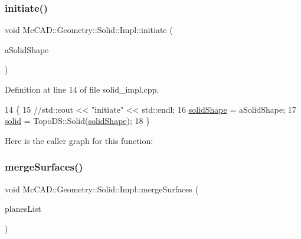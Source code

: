 \mbox{\label{classMcCAD_1_1Geometry_1_1Solid_1_1Impl_a2f57c8ff307a31cf90fa29cebf14ff3f}} 
\subsubsection{\texorpdfstring{initiate()}{initiate()}\hspace{0.1cm}{\footnotesize\ttfamily [2/2]}}
{\footnotesize\ttfamily void Mc\+C\+A\+D\+::\+Geometry\+::\+Solid\+::\+Impl\+::initiate (\begin{DoxyParamCaption}\item[{const Topo\+D\+S\+\_\+\+Shape \&}]{a\+Solid\+Shape }\end{DoxyParamCaption})}



Definition at line 14 of file solid\+\_\+impl.\+cpp.


\begin{DoxyCode}
14                                                                \{
15     \textcolor{comment}{//std::cout << "initiate" << std::endl;}
16     \hyperlink{classMcCAD_1_1Geometry_1_1Solid_1_1Impl_afcbcbf0a3fa169631d546d96e430f91f}{solidShape} = aSolidShape;
17     \hyperlink{classMcCAD_1_1Geometry_1_1Solid_1_1Impl_a279f71c11f2a7b285e3093879baf9362}{solid} = TopoDS::Solid(\hyperlink{classMcCAD_1_1Geometry_1_1Solid_1_1Impl_afcbcbf0a3fa169631d546d96e430f91f}{solidShape});
18 \}
\end{DoxyCode}
Here is the caller graph for this function\+:
\mbox{\label{classMcCAD_1_1Geometry_1_1Solid_1_1Impl_a7f434941fa38e84186ebb026342984c8}} 
\subsubsection{\texorpdfstring{merge\+Surfaces()}{mergeSurfaces()}\hspace{0.1cm}{\footnotesize\ttfamily [1/2]}}
{\footnotesize\ttfamily void Mc\+C\+A\+D\+::\+Geometry\+::\+Solid\+::\+Impl\+::merge\+Surfaces (\begin{DoxyParamCaption}\item[{std\+::vector$<$ std\+::unique\+\_\+ptr$<$ \hyperlink{classMcCAD_1_1Geometry_1_1BoundSurface}{Bound\+Surface} $>$$>$ \&}]{planes\+List }\end{DoxyParamCaption})}

